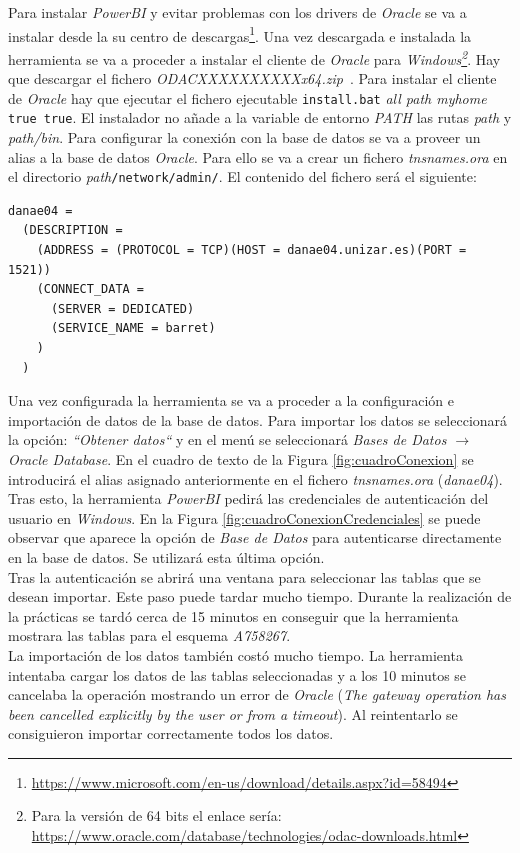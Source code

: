 \documentclass{article}
\begin{document}
Para instalar \textit{PowerBI} y evitar problemas con los drivers de \textit{Oracle} se va a instalar desde la su centro de descargas\footnote{\url{https://www.microsoft.com/en-us/download/details.aspx?id=58494}}. Una vez descargada e instalada la herramienta se va a proceder a instalar el cliente de \textit{Oracle} para \textit{Windows\footnote{Para la versión de 64 bits el enlace sería: \url{https://www.oracle.com/database/technologies/odac-downloads.html}}}. Hay que descargar el fichero \textit{ODACXXXXXXXXXXx64.zip}~\cite{ms:1}. Para instalar el cliente de \textit{Oracle} hay que ejecutar el fichero ejecutable \texttt{install.bat} \textit{all path myhome} \texttt{true true}. El instalador no añade a la variable de entorno \textit{PATH} las rutas \textit{path} y \textit{path/bin}. Para configurar la conexión con la base de datos se va a proveer un alias a la base de datos \textit{Oracle}. Para ello se va a crear un fichero \textit{tnsnames.ora} en el directorio \textit{path}\texttt{/network/admin/}. El contenido del fichero será el siguiente:

\begin{lstlisting}
danae04 =
  (DESCRIPTION =
    (ADDRESS = (PROTOCOL = TCP)(HOST = danae04.unizar.es)(PORT = 1521))
    (CONNECT_DATA =
      (SERVER = DEDICATED)
      (SERVICE_NAME = barret)
    )
  )
\end{lstlisting}

Una vez configurada la herramienta se va a proceder a la configuración e importación de datos de la base de datos. Para importar los datos se seleccionará la opción: \textit{``Obtener datos``} y en el menú se seleccionará \textit{Bases de Datos $\rightarrow$ Oracle Database}. En el cuadro de texto de la Figura \ref{fig:cuadroConexion} se introducirá el alias asignado anteriormente en el fichero \textit{tnsnames.ora} (\textit{danae04}). Tras esto, la herramienta \textit{PowerBI} pedirá las credenciales de autenticación del usuario en \textit{Windows}. En la Figura \ref{fig:cuadroConexionCredenciales} se puede observar que aparece la opción de \textit{Base de Datos} para autenticarse directamente en la base de datos. Se utilizará esta última opción.\\
Tras la autenticación se abrirá una ventana para seleccionar las tablas que se desean importar. Este paso puede tardar mucho tiempo. Durante la realización de la prácticas se tardó cerca de 15 minutos en conseguir que la herramienta mostrara las tablas para el esquema \textit{A758267}.\\
La importación de los datos también costó mucho tiempo. La herramienta intentaba cargar los datos de las tablas seleccionadas y a los 10 minutos se cancelaba la operación mostrando un error de \textit{Oracle} (\textit{The gateway operation has been cancelled explicitly by the user or from a timeout}). Al reintentarlo se consiguieron importar correctamente todos los datos.\\
\end{document}
